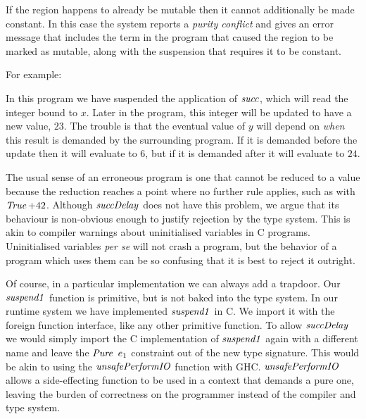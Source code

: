 If the region happens to already be mutable then it cannot additionally be made constant. In this case the system reports a \emph{purity conflict} and gives an error message that includes the term in the program that caused the region to be marked as mutable, along with the suspension that requires it to be constant.

\clearpage{}
For example:


In this program we have suspended the application of $\operatorname{\mathit{succ}}$, which will read the integer bound to $x$. Later in the program, this integer will be updated to have a new value, $23$. The trouble is that the eventual value of $y$ will depend on \emph{when} this result is demanded by the surrounding program. If it is demanded before the update then it will evaluate to $6$, but if it is demanded after it will evaluate to $24$.

The usual sense of an erroneous program is one that cannot be reduced to a value because the reduction reaches a point where no further rule applies, such as with $\operatorname{\mathit{True}} + 42$. Although $\operatorname{\mathit{succDelay}}$ does not have this problem, we argue that its behaviour is non-obvious enough to justify rejection by the type system. This is akin to compiler warnings about uninitialised variables in C programs. Uninitialised variables \emph{per se} will not crash a program, but the behavior of a program which uses them can be so confusing that it is best to reject it outright. 

Of course, in a particular implementation we can always add a trapdoor. Our $\operatorname{\mathit{suspend1}}$ function is primitive, but is not baked into the type system. In our runtime system we have implemented $\operatorname{\mathit{suspend1}}$ in C. We import it with the foreign function interface, like any other primitive function. To allow $\operatorname{\mathit{succDelay}}$ we would simply import the C implementation of $\operatorname{\mathit{suspend1}}$ again with a different name and leave the $\operatorname{\mathit{Pure}} \ e_1$ constraint out of the new type signature. This would be akin to using the $\operatorname{\mathit{unsafePerformIO}}$ function with GHC. $\operatorname{\mathit{unsafePerformIO}}$ allows a side-effecting function to be used in a context that demands a pure one, leaving the burden of correctness on the programmer instead of the compiler and type system.


